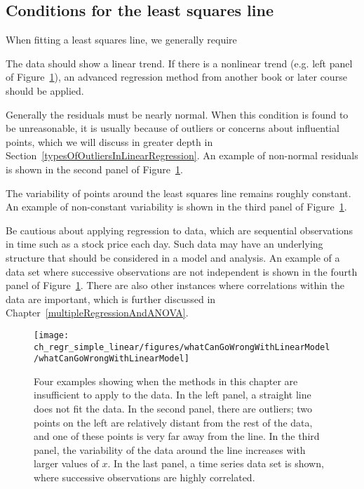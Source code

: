 \subsection{Conditions for the least squares line}

When fitting a least squares line, we generally require
\begin{description}
\setlength{\itemsep}{0mm}
\item[Linearity.] The data should show a linear trend. If there is a nonlinear trend (e.g. left panel of Figure~\ref{whatCanGoWrongWithLinearModel}), an advanced regression method from another book or later course should be applied.
\item[Nearly normal residuals.] Generally the residuals must be nearly normal.
When this condition is found to be unreasonable, it is usually because of outliers or concerns about influential points, which we  will discuss in greater depth in Section~\ref{typesOfOutliersInLinearRegression}. An example of non-normal residuals is shown in the second panel of Figure~\ref{whatCanGoWrongWithLinearModel}.
\item[Constant variability.] The variability of points around the least squares line remains roughly constant. An example of non-constant variability is shown in the third panel of Figure~\ref{whatCanGoWrongWithLinearModel}.
\item[Independent observations.] Be cautious about applying regression to  data, which are sequential observations in time such as a stock price each day. Such data may have an underlying structure that should be considered in a model and analysis. An example of a data set where successive observations are not independent is shown in the fourth panel of Figure~\ref{whatCanGoWrongWithLinearModel}. There are also other instances where correlations within the data are important, which is further discussed in Chapter~\ref{multipleRegressionAndANOVA}.
\end{description}

\begin{figure}
\centering
\texttt{[image: ch\_regr\_simple\_linear/figures/whatCanGoWrongWithLinearModel/whatCanGoWrongWithLinearModel]}
\caption{Four examples showing when the methods in this chapter are insufficient to apply to the data. In the left panel, a straight line does not fit the data. In the second panel, there are outliers; two points on the left are relatively distant from the rest of the data, and one of these points is very far away from the line. In the third panel, the variability of the data around the line increases with larger values of $x$. In the last panel, a time series data set is shown, where successive observations are highly correlated.}
\label{whatCanGoWrongWithLinearModel}
\end{figure}

